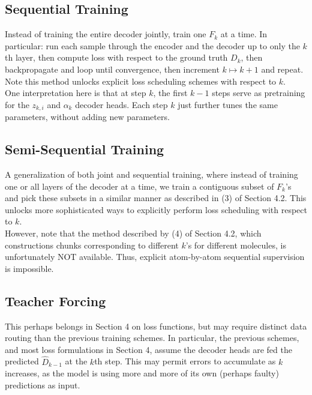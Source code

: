 \documentclass[12pt]{article}
\begin{document}
    \subsection{Sequential Training}
    Instead of training the entire decoder jointly, train one $F_k$ at a time. In particular: run each sample through the encoder and the decoder up to only the $k$th layer, then compute loss with respect to the ground truth $D_k$, then backpropagate and loop until convergence, then increment $k \mapsto k+1$ and repeat. Note this method unlocks explicit loss scheduling schemes with respect to $k$. \\[-6pt]

    One interpretation here is that at step $k$, the first $k-1$ steps serve as pretraining for the $z_{k, i}$ and $\alpha_k$ decoder heads. Each step $k$ just further tunes the same parameters, without adding new parameters. 

    \subsection{Semi-Sequential Training}
    A generalization of both joint and sequential training, where instead of training one or all layers of the decoder at a time, we train a contiguous subset of $F_k$'s and pick these subsets in a similar manner as described in (3) of Section 4.2. This unlocks more sophisticated ways to explicitly perform loss scheduling with respect to $k$. \\[-6pt]
    
    However, note that the method described by (4) of Section 4.2, which constructions chunks corresponding to different $k$'s for different molecules, is unfortunately NOT available. Thus, explicit atom-by-atom sequential supervision is impossible. 

    \subsection{Teacher Forcing}
    This perhaps belongs in Section 4 on loss functions, but may require distinct data routing than the previous training schemes. In particular, the previous schemes, and most loss formulations in Section 4, assume the decoder heads are fed the predicted $\hat D_{k-1}$ at the $k$th step. This may permit errors to accumulate as $k$ increases, as the model is using more and more of its own (perhaps faulty) predictions as input. \\[-6pt]
\end{document}
